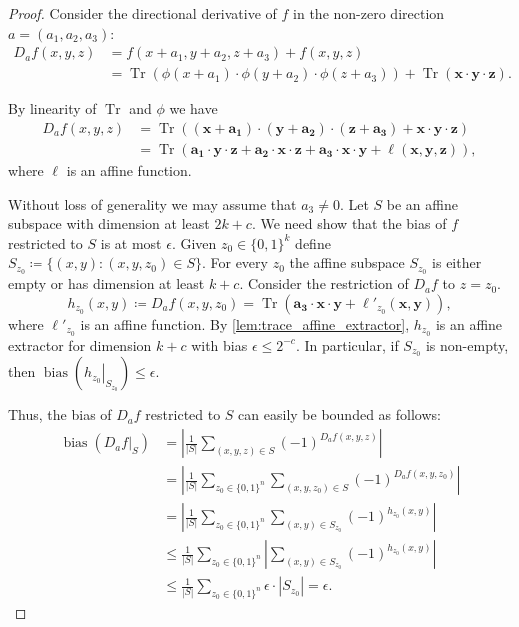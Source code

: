 \documentclass[10pt,a4paper]{article}
\theoremstyle{definition}
\theoremstyle{remark}
\DeclareMathOperator{\Tr}{Tr}
\DeclareMathOperator{\bias}{bias}
\newcommand{\card}[1]{{\left|#1\right|}}
\newcommand{\iso}[1]{\mathbf{#1}}
\newcommand{\Q}{{\{0,1\}}}
\newcommand{\restr}[2]{\left.#1\right|_{#2}}
\begin{document}
\begin{proof}
  Consider the directional derivative of $f$ in the non-zero direction $a = (a_1,a_2,a_3)$:
  \begin{align*}
    D_{a} f(x, y, z) &=
    f(x+a_1, y+a_2, z+a_3) + f(x, y, z) \\ &=
    \Tr(\phi(x+a_1) \cdot \phi(y+a_2) \cdot \phi(z+a_3)) + \Tr(\iso{x} \cdot \iso{y} \cdot \iso{z}).
  \end{align*}

  By linearity of $\Tr$ and $\phi$ we have
  \begin{align*}
    D_{a} f(x, y, z) &=
    \Tr((\iso{x}+\iso{a_1}) \cdot (\iso{y} + \iso{a_2}) \cdot (\iso{z} + \iso{a_3}) + \iso{x} \cdot \iso{y} \cdot \iso{z}) \\ &=
    \Tr(\iso{a_1} \cdot \iso{y} \cdot \iso{z} + \iso{a_2} \cdot \iso{x} \cdot \iso{z} + \iso{a_3} \cdot \iso{x} \cdot \iso{y} + \ell(\iso{x},\iso{y},\iso{z})),
  \end{align*}
  where $\ell$ is an affine function.

  Without loss of generality we may assume that $a_3 \neq 0$.
  Let $S$ be an affine subspace with dimension at least $2k+c$. We need show that the bias of $f$ restricted to $S$ is at most $\epsilon$. Given $z_0 \in \Q^k$ define $S_{z_0} \coloneqq \{(x, y) : (x, y, z_0) \in S\}$. For every $z_0$ the affine subspace $S_{z_0}$ is either empty or has dimension at least $k+c$.
  Consider the restriction of $D_a f$ to $z = z_0$.
  \[
    h_{z_0}(x, y) \coloneqq D_a f(x, y, z_0) = \Tr(\iso{a_3} \cdot \iso{x} \cdot \iso{y} + \ell'_{z_0}(\iso{x}, \iso{y})),
  \]
  where $\ell'_{z_0}$ is an affine function. By \cref{lem:trace_affine_extractor}, $h_{z_0}$ is an affine extractor for dimension $k+c$ with bias $\epsilon \le 2^{-c}$. In particular, if $S_{z_0}$ is non-empty, then $\bias(\restr{h_{z_0}}{S_{z_0}}) \le \epsilon$.

  Thus, the bias of $D_a f$ restricted to $S$ can easily be bounded as follows:
  \begin{align*}
    \bias(\restr{D_a f}{S}) &=
    \left|\frac{1}{\card{S}} \sum_{(x, y, z) \in S} {(-1)}^{D_a f(x, y, z)}\right| \\ &=
    \left|\frac{1}{\card{S}} \sum_{z_0 \in \Q^n} \sum_{(x, y, z_0) \in S} {(-1)}^{D_a f(x, y, z_0)}\right| \\ &=
    \left|\frac{1}{\card{S}} \sum_{z_0 \in \Q^n} \sum_{(x, y) \in S_{z_0}} {(-1)}^{h_{z_0}(x, y)}\right| \\ &\le
    \frac{1}{\card{S}} \sum_{z_0 \in \Q^n} \left|\sum_{(x, y) \in S_{z_0}} {(-1)}^{h_{z_0}(x, y)}\right| \\ &\le
    \frac{1}{\card{S}} \sum_{z_0 \in \Q^n} \epsilon \cdot \card{S_{z_0}} = \epsilon.
  \end{align*}
\end{proof}
\end{document}
